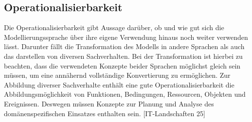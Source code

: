 \subsection{Operationalisierbarkeit}
\label{ssc:Operationalisierbarkeit}
Die Operationalisierbarkeit gibt Aussage darüber, ob und wie gut sich die Modellierungssprache über ihre eigene Verwendung hinaus noch weiter verwenden lässt.
Darunter fällt die Transformation des Modells in andere Sprachen als auch das darstellen von diversen Sachverhalten.
Bei der Transformation ist hierbei zu beachten, dass die verwendeten Konzepte beider Sprachen möglichst gleich sein müssen,
um eine annähernd vollständige Konvertierung zu ermöglichen. Zur Abbildung diverser Sachverhalte enthält eine gute Operationalisierbarkeit die Abbildungsmöglichkeit von Funktionen, Bedingungen, Ressourcen, Objekten und Ereignissen.
Deswegen müssen Konzepte zur Planung und Analyse des domänenspezifischen Einsatzes enthalten sein.
[IT-Landschaften 25]

